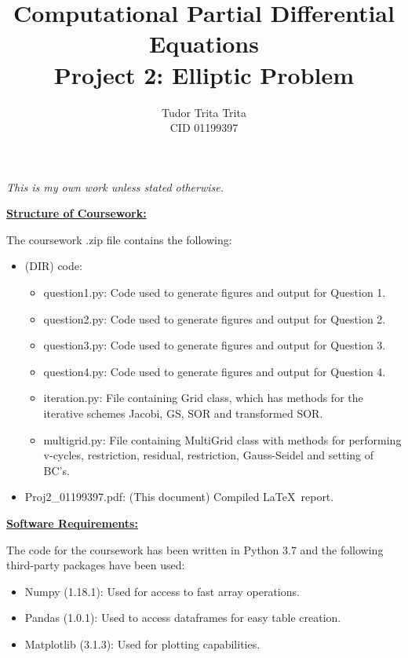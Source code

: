 \documentclass[12pt]{article}
\title{\textbf{Computational Partial Differential Equations \\ Project 2: Elliptic Problem}}
\author{Tudor Trita Trita \\ CID 01199397}
\begin{document}
\maketitle
\vspace{-0.7cm}
\begin{center}
\textit{This is my own work unless stated otherwise.}
\end{center}

\underline{\textbf{Structure of Coursework:}}

    The coursework .zip file contains the following:
    \begin{itemize}
        \item (DIR) code:
        \begin{itemize}
            \item question1.py: Code used to generate figures and output for Question 1.
            \item question2.py: Code used to generate figures and output for Question 2.
            \item question3.py: Code used to generate figures and output for Question 3.
            \item question4.py: Code used to generate figures and output for Question 4.
            \item iteration.py: File containing Grid class, which has methods for the iterative schemes Jacobi, GS, SOR and transformed SOR.
            \item multigrid.py: File containing MultiGrid class with methods for performing v-cycles, restriction, residual, restriction, Gauss-Seidel and setting of BC's.
        \end{itemize}
        \item Proj2\_01199397.pdf: (This document) Compiled \LaTeX \ report.
    \end{itemize}

\underline{\textbf{Software Requirements:}}

    The code for the coursework has been written in Python 3.7 and the following third-party packages have been used:
    \begin{itemize}
        \item Numpy (1.18.1): Used for access to fast array operations.
        \item Pandas (1.0.1): Used to access dataframes for easy table creation.
        \item Matplotlib (3.1.3): Used for plotting capabilities.
    \end{itemize}
\end{document}
